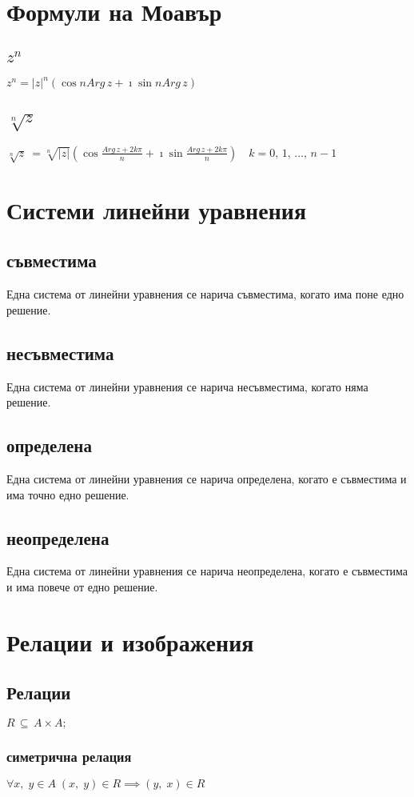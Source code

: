 \documentclass[12pt]{article}
\begin{document}
    \section{Формули на Моавър}
    \subsection{\(z^n\)}
    \(z^n = |z|^n(\cos{nArg\,z} + \imath\sin{nArg\,z})\)
    \subsection{\(\sqrt[n]z\)}
    \(\sqrt[n]z\ = \sqrt[n]{|z|}(\cos{\frac{Arg\,z + 2k\pi}{n}} + \imath\sin{\frac{Arg\,z + 2k\pi}{n}}) \quad k = 0, \, 1, \, \dots, \, n - 1\)
    \section{Системи линейни уравнения}
    \subsection{съвместима}
    Една система от линейни уравнения се нарича съвместима, когато има поне едно решение.
    \subsection{несъвместима}
    Една система от линейни уравнения се нарича несъвместима, когато няма решение.
    \subsection{определена}
    Една система от линейни уравнения се нарича определена, когато е съвместима и има точно едно решение.
    \subsection{неопределена}
    Една система от линейни уравнения се нарича неопределена, когато е съвместима и има повече от едно решение.
    \section{Релации и изображения}
    \subsection{Релации}
    \(R \, \subseteq \, A \times A;\)
    \subsubsection{симетрична релация}
    \(\forall x, \; y \in A \; (x, \; y) \in R \implies (y, \; x) \in R \)
\end{document}
